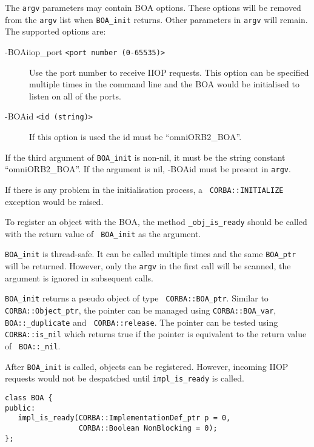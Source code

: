 \documentclass[11pt,twoside,onecolumn]{book}
\begin{document}
The {\tt argv} parameters may contain BOA options. These options will be
removed from the {\tt argv} list when {\tt BOA\_init} returns. Other
parameters in {\tt argv} will remain. The supported options are:

\begin{description}

\item[-BOAiiop\_port {\tt <port number (0-65535)>}] Use the port number to receive
IIOP requests. This option can be specified multiple times in the command
line and the BOA would be initialised to listen on all of the ports.

\item[-BOAid {\tt <id (string)>}] If this option is used the id must be
``omniORB2\_BOA''. 

\end{description}

If the third argument of {\tt BOA\_init} is non-nil, it must be the string
constant ``omniORB2\_BOA''. If the argument is nil, -BOAid must be present
in {\tt argv}.

If there is any problem in the initialisation process, a {\tt
CORBA::INITIALIZE} exception would be raised.

To register an object with the BOA, the method
{\tt \_obj\_is\_ready} should be called with the return value of {\tt
BOA\_init} as the argument.

{\tt BOA\_init} is thread-safe. It can be called multiple times and the
same {\tt BOA\_ptr} will be returned. However, only the {\tt argv} in the
first call will be scanned, the argument is ignored in subsequent calls.

{\tt BOA\_init} returns a pseudo object of type {\tt
CORBA::BOA\_ptr}. Similar to {\tt CORBA::Object\_ptr}, the pointer can be
managed using {\tt CORBA::BOA\_var}, {\tt BOA::\_duplicate} and {\tt
CORBA::release}. The pointer can be tested using {\tt CORBA::is\_nil} which
returns true if the pointer is equivalent to the return value of {\tt
BOA::\_nil}. 

After {\tt BOA\_init} is called, objects can be registered. However,
incoming IIOP requests would not be despatched until {\tt impl\_is\_ready}
is called.

{\small
\begin{verbatim}
class BOA {
public:
   impl_is_ready(CORBA::ImplementationDef_ptr p = 0,
                 CORBA::Boolean NonBlocking = 0);
};
\end{verbatim}
}
\end{document}
